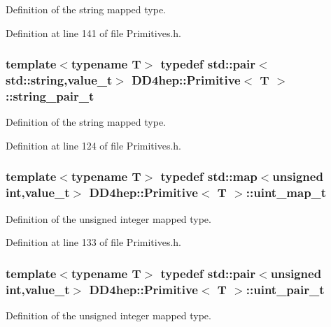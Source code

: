 Definition of the string mapped type. 

Definition at line 141 of file Primitives.h.\hypertarget{struct_d_d4hep_1_1_primitive_ab799730f156ae3e2ba15f621289c0e99}{
\subsubsection[{string\_\-pair\_\-t}]{\setlength{\rightskip}{0pt plus 5cm}template$<$typename T$>$ typedef std::pair$<$std::string,{\bf value\_\-t}$>$ {\bf DD4hep::Primitive}$<$ {\bf T} $>$::{\bf string\_\-pair\_\-t}}}
\label{struct_d_d4hep_1_1_primitive_ab799730f156ae3e2ba15f621289c0e99}


Definition of the string mapped type. 

Definition at line 124 of file Primitives.h.\hypertarget{struct_d_d4hep_1_1_primitive_a6c4a254056e6d4de6c023c0f099ad40f}{
\subsubsection[{uint\_\-map\_\-t}]{\setlength{\rightskip}{0pt plus 5cm}template$<$typename T$>$ typedef std::map$<$unsigned int,{\bf value\_\-t}$>$ {\bf DD4hep::Primitive}$<$ {\bf T} $>$::{\bf uint\_\-map\_\-t}}}
\label{struct_d_d4hep_1_1_primitive_a6c4a254056e6d4de6c023c0f099ad40f}


Definition of the unsigned integer mapped type. 

Definition at line 133 of file Primitives.h.\hypertarget{struct_d_d4hep_1_1_primitive_a1f46f9637b5b90c407a5725db6d09142}{
\subsubsection[{uint\_\-pair\_\-t}]{\setlength{\rightskip}{0pt plus 5cm}template$<$typename T$>$ typedef std::pair$<$unsigned int,{\bf value\_\-t}$>$ {\bf DD4hep::Primitive}$<$ {\bf T} $>$::{\bf uint\_\-pair\_\-t}}}
\label{struct_d_d4hep_1_1_primitive_a1f46f9637b5b90c407a5725db6d09142}


Definition of the unsigned integer mapped type. 

